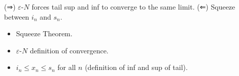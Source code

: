 \begin{remark*}
(⇒) $\varepsilon$-$N$ forces tail sup and inf to converge to the same limit. (⇐) Squeeze between $i_n$ and $s_n$.
\end{remark*}

\begin{remark*}[Dependencies]
\begin{itemize}
  \item Squeeze Theorem.
  \item $\varepsilon$-$N$ definition of convergence.
  \item $i_n \le x_n \le s_n$ for all $n$ (definition of inf and sup of tail).
\end{itemize}
\end{remark*}
